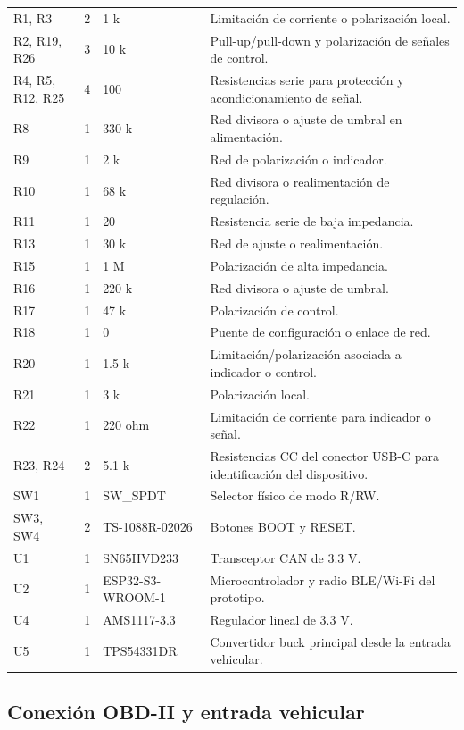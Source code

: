 \documentclass[12pt,letterpaper]{report}
\begin{document}
\begin{longtable}{@{}p{}p{}p{}p{}@{}}
R1, R3 & 2 & 1 k & Limitación de corriente o polarización local. \\
R2, R19, R26 & 3 & 10 k & Pull-up/pull-down y polarización de señales de control. \\
R4, R5, R12, R25 & 4 & 100 & Resistencias serie para protección y acondicionamiento de señal. \\
R8 & 1 & 330 k & Red divisora o ajuste de umbral en alimentación. \\
R9 & 1 & 2 k & Red de polarización o indicador. \\
R10 & 1 & 68 k & Red divisora o realimentación de regulación. \\
R11 & 1 & 20 & Resistencia serie de baja impedancia. \\
R13 & 1 & 30 k & Red de ajuste o realimentación. \\
R15 & 1 & 1 M & Polarización de alta impedancia. \\
R16 & 1 & 220 k & Red divisora o ajuste de umbral. \\
R17 & 1 & 47 k & Polarización de control. \\
R18 & 1 & 0 & Puente de configuración o enlace de red. \\
R20 & 1 & 1.5 k & Limitación/polarización asociada a indicador o control. \\
R21 & 1 & 3 k & Polarización local. \\
R22 & 1 & 220 ohm & Limitación de corriente para indicador o señal. \\
R23, R24 & 2 & 5.1 k & Resistencias CC del conector USB-C para identificación del dispositivo. \\
SW1 & 1 & SW\_SPDT & Selector físico de modo R/RW. \\
SW3, SW4 & 2 & TS-1088R-02026 & Botones BOOT y RESET. \\
U1 & 1 & SN65HVD233 & Transceptor CAN de 3.3 V. \\
U2 & 1 & ESP32-S3-WROOM-1 & Microcontrolador y radio BLE/Wi-Fi del prototipo. \\
U4 & 1 & AMS1117-3.3 & Regulador lineal de 3.3 V. \\
U5 & 1 & TPS54331DR & Convertidor buck principal desde la entrada vehicular. \\
\bottomrule
\end{longtable}

\subsection{Conexión OBD-II y entrada vehicular}
\end{document}
